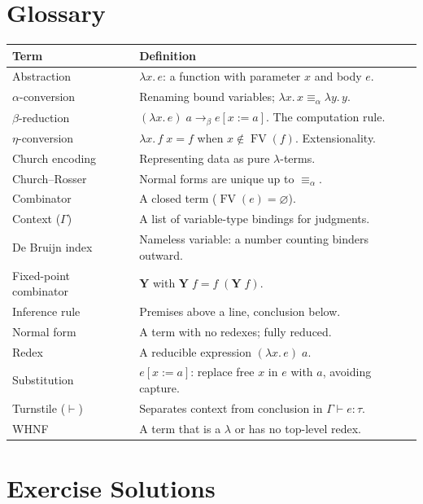 \documentclass[11pt,a4paper]{article}
\theoremstyle{definition}
\newcommand{\lam}{\lambda}
\newcommand{\reduce}{\longrightarrow_\beta}
\newcommand{\aeq}{\equiv_\alpha}
\newcommand{\FV}{\operatorname{FV}}
\newcommand{\proves}{\vdash}
\begin{document}
\bigskip

\section{Glossary}\label{app:glossary}

\renewcommand{\arraystretch}{1.5}
\begin{tabular}{lp{10cm}}
\textbf{Term} & \textbf{Definition} \\
\hline
Abstraction & $\lam x.\, e$: a function with parameter $x$ and body $e$. \\
$\alpha$-conversion & Renaming bound variables; $\lam x.\,x \aeq \lam y.\,y$. \\
$\beta$-reduction & $(\lam x.\, e)\;a \reduce e[x := a]$. The computation rule. \\
$\eta$-conversion & $\lam x.\, f\;x = f$ when $x \notin \FV(f)$. Extensionality. \\
Church encoding & Representing data as pure $\lam$-terms. \\
Church--Rosser & Normal forms are unique up to $\aeq$. \\
Combinator & A closed term ($\FV(e) = \varnothing$). \\
Context ($\Gamma$) & A list of variable-type bindings for judgments. \\
De Bruijn index & Nameless variable: a number counting binders outward. \\
Fixed-point combinator & $\mathbf{Y}$ with $\mathbf{Y}\;f = f\;(\mathbf{Y}\;f)$. \\
Inference rule & Premises above a line, conclusion below. \\
Normal form & A term with no redexes; fully reduced. \\
Redex & A reducible expression $(\lam x.\, e)\;a$. \\
Substitution & $e[x := a]$: replace free $x$ in $e$ with $a$, avoiding capture. \\
Turnstile ($\proves$) & Separates context from conclusion in $\Gamma \proves e : \tau$. \\
WHNF & A term that is a $\lam$ or has no top-level redex. \\
\end{tabular}

\newpage
\section{Exercise Solutions}\label{app:solutions}
\end{document}
